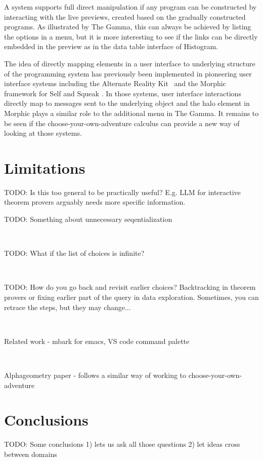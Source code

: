 \documentclass[a4paper,UKenglish,cleveref, autoref, thm-restate]{lipics-v2021}
\begin{document}
A system supports full direct manipulation if any program can be constructed by interacting with
the live previews, created based on the gradually constructed programs. As illustrated by The Gamma,
this can always be achieved by listing the options in a menu, but it is more interesting to see
if the links can be directly embedded in the preview as in the data table interface of Histogram.

The idea of directly mapping elements in a user interface to underlying structure of the
programming system has previously been implemented in pioneering user interface systems
including the Alternate Reality Kit~\cite{randall-1986-ark} and the Morphic framework for
Self and Squeak \cite{maloney-1995-morphic,maloney-2001-morphic}. In those systems, user interface
interactions directly map to messages sent to the underlying object and the halo element in
Morphic plays a similar role to the additional menu in The Gamma. It remains to be seen if
the choose-your-own-adventure calculus can provide a new way of looking at those systems.

\section{Limitations}
\label{sec:limitations}

TODO: Is this too general to be practically useful? E.g. LLM for interactive theorem provers
arguably needs more specific information.

\noindent
TODO: Something about unnecessary seqentialization

~

\noindent
TODO: What if the list of choices is infinite?

~

\noindent
TODO: How do you go back and revisit earlier choices? Backtracking in theorem provers or
fixing earlier part of the query in data exploration. Sometimes, you can retrace the
steps, but they may change...

~

\noindent
Related work - mbark for emacs, VS code command palette

~

\noindent
Alphageometry paper - follows a similar way of working to choose-your-own-adventure

\section{Conclusions}

TODO: Some conclusions
1) lets us ask all those questions
2) let ideas cross between domains

\newpage



\end{document}
